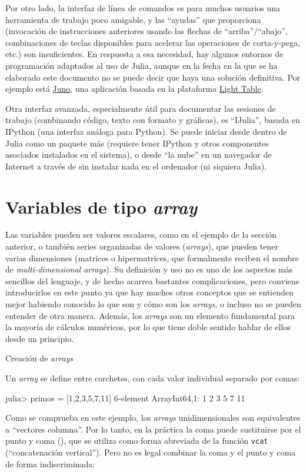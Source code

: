 ﻿\documentclass{article}
\newcommand{\code}{\texttt}
\begin{document}
Por otro lado, la interfaz de línea de comandos es para muchos usuarios una herramienta de trabajo poco amigable, y las ``ayudas'' que proporciona (invocación de instrucciones anteriores usando las flechas de ``arriba''/``abajo'', combinaciones de teclas disponibles para acelerar las operaciones de corta-y-pega, etc.) son insuficientes. En respuesta a esa necesidad, hay algunos entornos de programación adaptados al uso de Julia, aunque en la fecha en la que se ha elaborado este documento no se puede decir que haya una solución definitiva. Por ejemplo está \href{http://junolab.org/}{Juno}, una aplicación basada en la plataforma \href{http://lighttable.com/}{Light Table}.

Otra interfaz avanzada, especialmente útil para documentar las sesiones de trabajo (combinando código, texto con formato y gráficas), es ``IJulia'', basada en IPython (una interfaz análoga para Python). Se puede iniciar desde dentro de Julia como un paquete más (requiere tener IPython y otros componentes asociados instalados en el sistema), o desde ``la nube'' en un navegador de Internet a través de  sin instalar nada en el ordenador (ni siquiera Julia).


\section{Variables de tipo \emph{array}}

Las variables pueden ser valores escalares, como en el ejemplo de la sección anterior, o también series organizadas de valores (\emph{arrays}), que pueden tener varias dimensiones (matrices o hipermatrices, que formalmente reciben el nombre de \emph{multi-dimensional arrays}). Su definición y uso no es uno de los aspectos más sencillos del lenguaje, y de hecho acarrea bastantes complicaciones, pero conviene introducirlos en este punto ya que hay muchos otros conceptos que se entienden mejor habiendo conocido lo que son y cómo son los \emph{arrays}, o incluso no se pueden entender de otra manera. Además, los \emph{arrays} son un elemento fundamental para la mayoría de cálculos numéricos, por lo que tiene doble sentido hablar de ellos desde un principio.

Creación de \emph{arrays}

Un \emph{array} se define entre corchetes, con cada valor individual separado por comas:

julia> primos = [1,2,3,5,7,11]
6-element Array{Int64,1}:
 1
 2
 3
 5
 7
 11

Como se comprueba en este ejemplo, los \emph{arrays} unidimensionales son equivalentes a ``vectores columna''. Por lo tanto, en la práctica la coma puede sustituirse por el punto y coma (\codet{;}), que se utiliza como forma abreviada de la función \code{vcat} (``concatenación vertical''). Pero no es legal combinar la coma y el punto y coma de forma indiscriminada:
\end{document}
